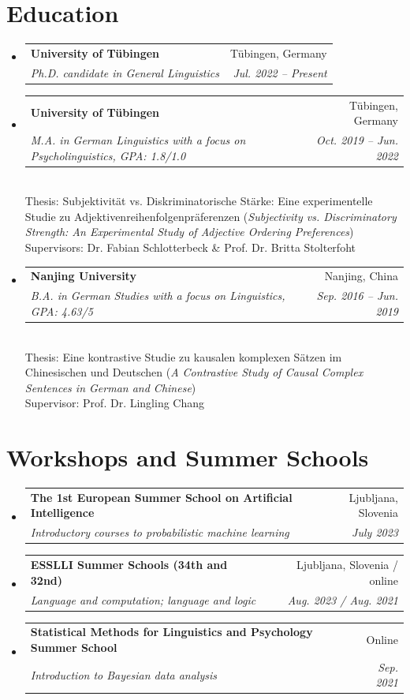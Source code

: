 \documentclass[letterpaper,11pt]{article}
\makeatletter
\newcommand{\resumeSubheading}[4]{
  \vspace{-1pt}\item
    \begin{tabular*}{0.97\textwidth}{l@{\extracolsep{\fill}}r}
      \textbf{#1} & #2 \\
      \textit{\small#3} & \textit{\small #4} \\
    \end{tabular*}\vspace{-5pt}
}
\newcommand{\resumeSubHeadingListStart}{\begin{itemize}[leftmargin=*]}
\newcommand{\resumeSubHeadingListEnd}{\end{itemize}}
\makeatother
\begin{document}
\section{Education}
  \resumeSubHeadingListStart
    \resumeSubheading
      {University of Tübingen}{Tübingen, Germany}
      {Ph.D. candidate in General Linguistics}{Jul. 2022 -- Present}

    \resumeSubheading
      {University of Tübingen}{Tübingen, Germany}
      {M.A. in German Linguistics with a focus on Psycholinguistics, GPA: 1.8/1.0}{Oct. 2019 -- Jun. 2022}
      \\
      \vspace{1em}
    {Thesis: Subjektivität vs. Diskriminatorische Stärke: Eine experimentelle Studie zu Adjektivenreihenfolgenpräferenzen (\textit{Subjectivity vs. Discriminatory Strength: An Experimental Study of Adjective Ordering Preferences}) \\
    Supervisors: Dr. Fabian Schlotterbeck \& Prof. Dr. Britta Stolterfoht}
	    
    \resumeSubheading
      {Nanjing University}{Nanjing, China}
      {B.A. in German Studies with a focus on Linguistics, GPA: 4.63/5}{Sep. 2016 -- Jun. 2019}\\
      \vspace{1em}
       {Thesis: Eine kontrastive Studie zu kausalen komplexen Sätzen im Chinesischen und Deutschen (\textit{A Contrastive Study of Causal Complex Sentences in German and Chinese}) \\
    Supervisor: Prof. Dr. Lingling Chang}
  \resumeSubHeadingListEnd

\section{Workshops and Summer Schools}
\resumeSubHeadingListStart
\resumeSubheading
      {The 1st European Summer School on Artificial Intelligence}{Ljubljana, Slovenia}
      {Introductory courses to probabilistic machine learning}{July 2023}
\resumeSubheading
      {ESSLLI Summer Schools (34th and 32nd)}{Ljubljana, Slovenia / online}
      {Language and computation; language and logic}{Aug. 2023 / Aug. 2021}
\resumeSubheading
      {Statistical Methods for Linguistics and Psychology Summer School}{Online}
      {Introduction to Bayesian data analysis}{Sep. 2021}
\resumeSubHeadingListEnd



\end{document}
